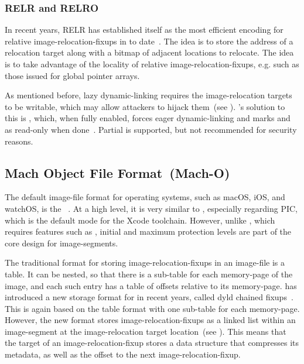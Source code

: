 \subsubsection{RELR and RELRO}

In recent years, RELR has established itself as the most efficient encoding for relative \glspl{image-relocation-fixup} in  to date~\cite{elf-relr}. The idea is to store the address of a relocation target along with a bitmap of adjacent locations to relocate. The idea is to take advantage of the locality of relative \glspl{image-relocation-fixup}, e.g. such as those issued for global pointer arrays.

As mentioned before, lazy \gls{dynamic-linking} requires the \gls{image-relocation} targets to be writable, which may allow attackers to hijack them~(see ). 's solution to this is , which, when fully enabled, forces eager \gls{dynamic-linking} and marks  and  as read-only when done~\cite{ld}. Partial  is supported, but not recommended for security reasons.

\subsection{Mach Object File Format~(Mach-O)}
\label{sec:macho}

The default \gls{image-file} format for  operating systems, such as macOS, iOS, and watchOS, is the ~\cite{macho-spec}. At a high level, it is very similar to , especially regarding \gls{PIC}, which is the default mode for the  Xcode toolchain. However, unlike , which requires features such as , initial and maximum protection levels are part of the  core design for \glspl{image-segment}.

The traditional format for storing \glspl{image-relocation-fixup} in an \gls{image-file} is a table. It can be nested, so that there is a sub-table for each \gls{memory-page} of the \gls{image}, and each such entry has a table of offsets relative to its \gls{memory-page}.  has introduced a new storage format for  in recent years, called dyld chained fixups~\cite{dyld_chains}. This is again based on the table format with one sub-table for each \gls{memory-page}. However, the new format stores \glspl{image-relocation-fixup} as a linked list within an \gls{image-segment} at the \gls{image-relocation} target location~(see ). This means that the target of an \gls{image-relocation-fixup} stores a data structure that compresses its metadata, as well as the offset to the next \gls{image-relocation-fixup}.

